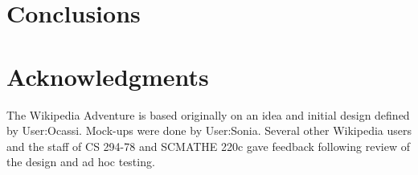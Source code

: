 \documentclass{acm_proc_article-sp}
\begin{document}
\section{Conclusions}



\section{Acknowledgments}
The Wikipedia Adventure is based originally on an idea and
initial design defined by User:Ocassi. Mock-ups
were done by User:Sonia. Several
other Wikipedia users and the staff of
CS 294-78 and SCMATHE 220c gave feedback following
review of the design and ad hoc testing.


\end{document}
